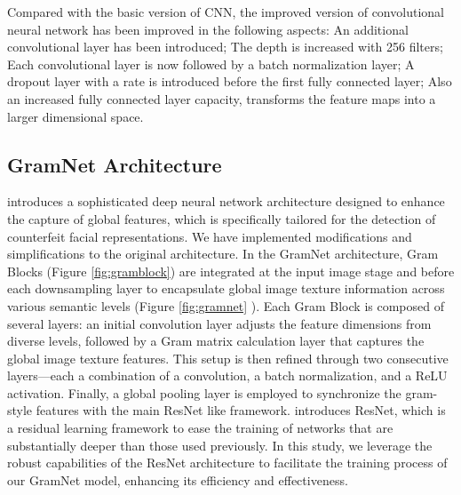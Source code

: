 \documentclass[final]{cvpr}
\begin{document}
Compared with the basic version of CNN, the improved version of convolutional neural network has been improved in the following aspects: An additional convolutional layer has been introduced; The depth is increased with 256 filters; Each convolutional layer is now followed by a batch normalization layer; A dropout layer with a rate is introduced before the first fully connected layer; Also an increased fully connected layer capacity, transforms the feature maps into a larger dimensional space.

\subsection{GramNet Architecture}
\cite{liu2020global} introduces a sophisticated deep neural network architecture designed to enhance the capture of global features, which is specifically tailored for the detection of counterfeit facial representations. We have implemented modifications and simplifications to the original architecture. In the GramNet architecture, Gram Blocks (Figure \ref{fig:gramblock}) are integrated at the input image stage and before each downsampling layer to encapsulate global image texture information across various semantic levels (Figure \ref{fig:gramnet} ). Each Gram Block is composed of several layers: an initial convolution layer adjusts the feature dimensions from diverse levels, followed by a Gram matrix calculation layer that captures the global image texture features. This setup is then refined through two consecutive layers—each a combination of a convolution, a batch normalization, and a ReLU activation. Finally, a global pooling layer is employed to synchronize the gram-style features with the main ResNet like framework. \cite{he2015deep} introduces ResNet, which is a residual learning framework to ease the training of networks that are substantially deeper than those used previously. In this study, we leverage the robust capabilities of the ResNet architecture to facilitate the training process of our GramNet model, enhancing its efficiency and effectiveness.
\end{document}
